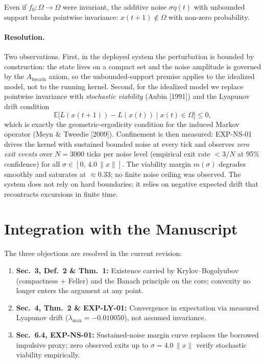 \documentclass[11pt]{article}
\newcommand{\E}{\mathbb{E}}
\begin{document}
Even if $f_0 : \Omega \to \Omega$ were invariant, the additive noise
$\sigma\eta(t)$ with unbounded support breaks pointwise invariance:
$x(t+1) \notin \Omega$ with non-zero probability.

\paragraph{Resolution.} Two observations. First, in the deployed system the
perturbation is bounded by construction: the state lives on a compact set and
the noise amplitude is governed by the $A_{\mathrm{breath}}$ axiom, so the
unbounded-support premise applies to the idealized model, not to the running
kernel. Second, for the idealized model we replace pointwise invariance with
\emph{stochastic viability} (Aubin [1991]) and the Lyapunov drift condition
\[
  \E\bigl[L(x(t+1)) - L(x(t)) \mid x(t) \in \Omega\bigr] \le 0,
\]
which is exactly the geometric-ergodicity condition for the induced Markov
operator (Meyn \& Tweedie [2009]). Confinement is then measured: EXP-NS-01
drives the kernel with sustained bounded noise at every tick and observes
\emph{zero exit events} over $N = 3000$ ticks per noise level
(empirical exit rate $< 3/N$ at 95\% confidence)
for all $\sigma \in [0,\, 4.0\,\|x\|]$.
The viability margin $m(\sigma)$ degrades smoothly and saturates at
$\approx 0.33$; no finite noise ceiling was observed. The system does not rely
on hard boundaries; it relies on negative expected drift that recontracts
excursions in finite time.

\section*{Integration with the Manuscript}

The three objections are resolved in the current revision:
\begin{enumerate}
  \item \textbf{Sec.~3, Def.~2 \& Thm.~1:} Existence carried by
        Krylov--Bogolyubov (compactness + Feller) and the Banach principle on
        the core; convexity no longer enters the argument at any point.
  \item \textbf{Sec.~4, Thm.~2 \& EXP-LY-01:} Convergence in expectation via
        measured Lyapunov drift ($\lambda_{\max} = -0.010050$), not assumed
        invariance.
  \item \textbf{Sec.~6.4, EXP-NS-01:} Sustained-noise margin curve replaces
        the borrowed impulsive proxy; zero observed exits up to
        $\sigma = 4.0\,\|x\|$ verify stochastic viability empirically.
\end{enumerate}
\end{document}
